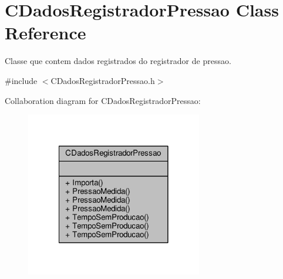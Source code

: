 \hypertarget{classCDadosRegistradorPressao}{\section{C\-Dados\-Registrador\-Pressao Class Reference}
\label{classCDadosRegistradorPressao}
}


Classe que contem dados registrados do registrador de pressao.  




{\ttfamily \#include $<$C\-Dados\-Registrador\-Pressao.\-h$>$}



Collaboration diagram for C\-Dados\-Registrador\-Pressao\-:
\nopagebreak
\begin{figure}[H]
\begin{center}
\leavevmode
\includegraphics[width=218pt]{classCDadosRegistradorPressao__coll__graph}
\end{center}
\end{figure}
